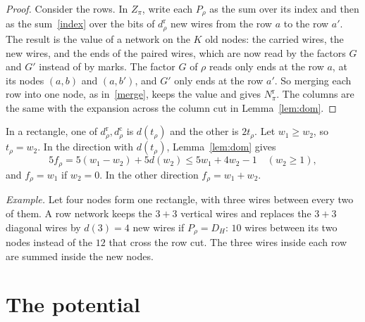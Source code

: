 \documentclass[11pt]{article}
\begin{document}
\begin{proof}
Consider the rows. In $Z_\pi$, write each $P_\rho$ as the sum over its index and then as the sum~\eqref{index} over the bits of $d^{\mathrm r}_\rho$ new wires from the row $a$ to the row $a'$. The result is the value of a network on the $K$ old nodes: the carried wires, the new wires, and the ends of the paired wires, which are now read by the factors $G$ and $G'$ instead of by marks. The factor $G$ of $\rho$ reads only ends at the row $a$, at its nodes $(a,b)$ and $(a,b')$, and $G'$ only ends at the row $a'$. So merging each row into one node, as in~\eqref{merge}, keeps the value and gives $N^{\mathrm r}_\pi$. The columns are the same with the expansion across the column cut in Lemma~\ref{lem:dom}.
\end{proof}

In a rectangle, one of $d^{\mathrm r}_\rho,d^{\mathrm c}_\rho$ is $d(t_\rho)$ and the other is $2t_\rho$. Let $w_1\ge w_2$, so $t_\rho=w_2$. In the direction with $d(t_\rho)$, Lemma~\ref{lem:dom} gives
\begin{equation}\label{fcheap}
5f_\rho=5(w_1-w_2)+5d(w_2)\le5w_1+4w_2-1\quad(w_2\ge1),
\end{equation}
and $f_\rho=w_1$ if $w_2=0$. In the other direction $f_\rho=w_1+w_2$.

\emph{Example.} Let four nodes form one rectangle, with three wires between every two of them. A row network keeps the $3+3$ vertical wires and replaces the $3+3$ diagonal wires by $d(3)=4$ new wires if $P_\rho=D_H$: $10$ wires between its two nodes instead of the $12$ that cross the row cut. The three wires inside each row are summed inside the new nodes.

\section{The potential}\label{sec:pot}
\end{document}
